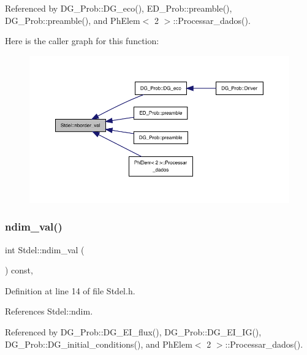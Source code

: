 Referenced by D\+G\+\_\+\+Prob\+::\+D\+G\+\_\+eco(), E\+D\+\_\+\+Prob\+::preamble(), D\+G\+\_\+\+Prob\+::preamble(), and Ph\+Elem$<$ 2 $>$\+::\+Processar\+\_\+dados().

Here is the caller graph for this function\+:
\nopagebreak
\begin{figure}[H]
\begin{center}
\leavevmode
\includegraphics[width=350pt]{classStdel_aac8e97661e46c48fafa91f13caa03a9f_icgraph}
\end{center}
\end{figure}
\mbox{\label{classStdel_a383df930bee8dc298d7d412b3b632ebb}} 
\subsubsection{\texorpdfstring{ndim\+\_\+val()}{ndim\_val()}}
{\footnotesize\ttfamily int Stdel\+::ndim\+\_\+val (\begin{DoxyParamCaption}{ }\end{DoxyParamCaption}) const\hspace{0.3cm}{\ttfamily [inline]}, {\ttfamily [inherited]}}



Definition at line 14 of file Stdel.\+h.



References Stdel\+::ndim.



Referenced by D\+G\+\_\+\+Prob\+::\+D\+G\+\_\+\+E\+I\+\_\+flux(), D\+G\+\_\+\+Prob\+::\+D\+G\+\_\+\+E\+I\+\_\+\+I\+G(), D\+G\+\_\+\+Prob\+::\+D\+G\+\_\+initial\+\_\+conditions(), and Ph\+Elem$<$ 2 $>$\+::\+Processar\+\_\+dados().

